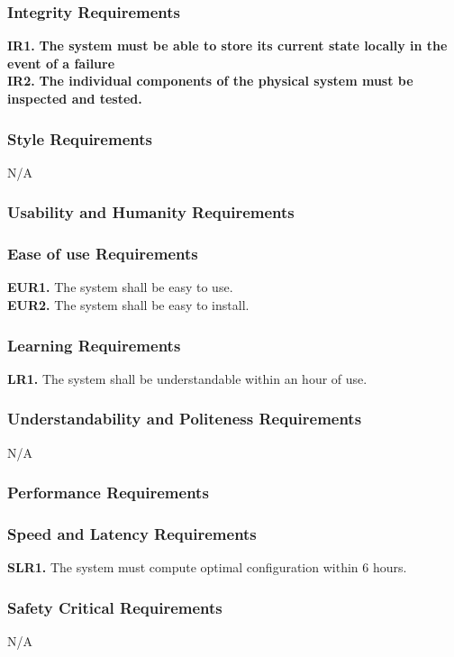 \documentclass[12pt, titlepage]{article}
\begin{document}
\subsubsection{Integrity Requirements}
\textbf{IR1.} \textbf{The system must be able to store its current state locally in the event of a failure}\\
\textbf{IR2.} \textbf{The individual components of the physical system must be inspected and tested.}

\subsubsection{Style Requirements}
N/A
\subsubsection{Usability and Humanity Requirements}
\subsubsection{Ease of use Requirements}
\textbf{EUR1.} The system shall be easy to use.\\
\textbf{EUR2.} The system shall be easy to install.

\subsubsection{Learning Requirements}
\textbf{LR1.} The system shall be understandable within an hour of use.

\subsubsection{Understandability and Politeness Requirements}
N/A

\subsubsection{Performance Requirements}
\subsubsection{Speed and Latency Requirements}
\textbf{SLR1.} The system must compute optimal configuration within 6 hours.

\subsubsection{Safety Critical Requirements}
N/A
\end{document}

